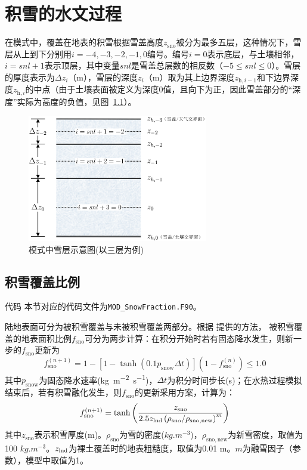 \chapter{积雪的水文过程}
在模式中，覆盖在地表的积雪根据雪盖高度$z_{\mathrm{sno}}$被分为最多五层，这种情况下，雪层从上到下分别用$i = −4, −3, −2, −1, 0$编号。编号$i = 0$表示底层，与土壤相邻，$i = snl + 1$表示顶层，其中变量$snl$是雪盖总层数的相反数（$-5\leqslant snl\leqslant 0$）。雪层的厚度表示为$\Delta z_i$（m），雪层的深度$z_i$（m）取为其上边界深度$z_{\mathrm{h},i-1}$和下边界深度$z_{\mathrm{h},i}$的中点（由于土壤表面被定义为深度0值，且向下为正，因此雪盖部分的“深度”实际为高度的负值，见图~\ref{fig:模式中积雪雪层示意图}）。
{
  \begin{figure}[htbp]
    \centering
    \includegraphics[width=0.7\textwidth]{Figures/雪盖土壤热力过程/模式中积雪雪层示意图.png}
    \caption{模式中雪层示意图(以三层为例)}
    \label{fig:模式中积雪雪层示意图}
  \end{figure}
}
\section{积雪覆盖比例}\label{积雪覆盖比例}
\begin{mymdframed}{代码}
  本节对应的代码文件为\texttt{MOD\_SnowFraction.F90}。
\end{mymdframed}

陆地表面可分为被积雪覆盖与未被积雪覆盖两部分。根据 \citet{swenson2012new}提供的方法，
被积雪覆盖的地表面积比例$f_{\mathrm{sno}}$可分为两步计算：在积分开始时若有固态降水发生，则新一步的$f_{\mathrm{sno}}$更新为
\begin{equation}
  f_{\mathrm{{sno }}}^{(n+1)}=1-\left[1-\tanh\left(0.1 p_{\mathrm{snow}} \Delta t\right)\right]\left(1-f_{\mathrm{{sno }}}^{(n)}\right) \leqslant 1.0
\end{equation}
其中$p_{\mathrm {snow}} $为固态降水速率(\unit{kg.m^{-2}.s^{-1}})，$\Delta t$为积分时间步长(s)；在水热过程模拟结束后，若有积雪融化发生，则$f_{\mathrm{sno}}$的更新采用\citet{niu2007ObservationbasedFormulationSnow}方案，计算为：
\begin{equation}
  f_{\mathrm{sno}}^{(n+1)}=\tanh{\left(\frac{z_{\mathrm{sno}}}{2.5 z_{\rm lnd} \left ( \rho_{\mathrm{sno}}/\rho_{\mathrm {sno,new}} \right )^m}\right)}
\end{equation}
其中$z_{\mathrm{sno}}$表示积雪厚度(m)。$\rho_{\mathrm{sno}}$为雪的密度($\unit{kg.m^{-3}}$)，$\rho_{\mathrm {sno,new}}$为新雪密度，取值为100 $\unit{kg.m^{-3}}$。$z_{\rm lnd}$为裸土覆盖时的地表粗糙度，取值为0.01 m。$m$为融雪因子（参数），模型中取值为1。

